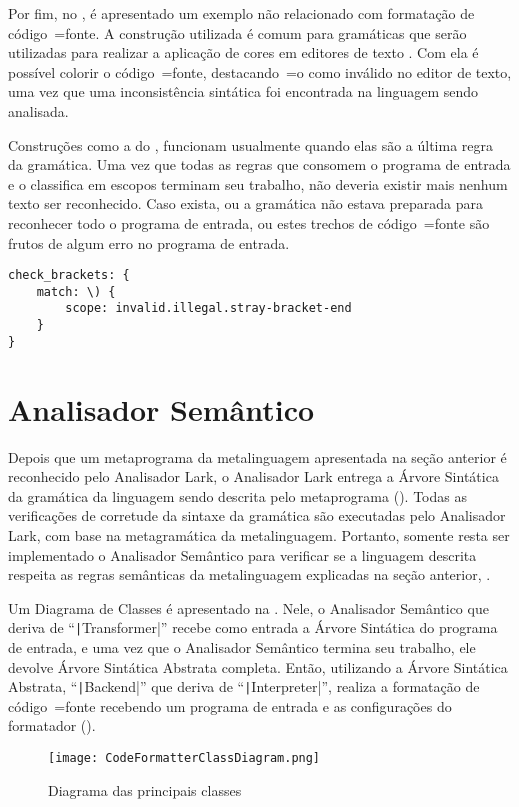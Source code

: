 Por fim,
no ,
é apresentado um exemplo não relacionado com formatação de código~=fonte.
A construção utilizada é comum para gramáticas que serão utilizadas para realizar a aplicação de cores em editores de texto \cite{vsCodeSyntaxHighlighthing}.
Com ela é possível colorir o código~=fonte,
destacando~=o como inválido no editor de texto,
uma vez que uma inconsistência sintática foi encontrada na linguagem sendo analisada.

Construções como a do ,
funcionam usualmente quando elas são a última regra da gramática.
Uma vez que todas as regras que consomem o programa de entrada e
o classifica em escopos terminam seu trabalho,
não deveria existir mais nenhum texto ser reconhecido.
Caso exista,
ou a gramática não estava preparada para reconhecer todo o programa de entrada,
ou estes trechos de código~=fonte são frutos de algum erro no programa de entrada.
\begin{lstlisting}[caption={Exemplo de Gramática, Reconhecimento de Erros},label={code:exemploDeGramaticaPawn5},style=yaml_style]
check_brackets: {
    match: \) {
        scope: invalid.illegal.stray-bracket-end
    }
}
\end{lstlisting}


\section{Analisador Semântico}
\label{section:AnalisadorSemantico}

Depois que um metaprograma da metalinguagem apresentada na seção anterior é reconhecido pelo Analisador Lark,
o Analisador Lark entrega a Árvore Sintática da gramática da linguagem sendo descrita pelo metaprograma ().
Todas as verificações de corretude da sintaxe da gramática são executadas pelo Analisador Lark,
com base na metagramática da metalinguagem.
Portanto,
somente resta ser implementado o Analisador Semântico para verificar se a linguagem descrita respeita as regras semânticas da metalinguagem explicadas na seção anterior,
.

Um Diagrama de Classes é apresentado na .
Nele,
o Analisador Semântico que deriva de ``\texttt|Transformer|'' recebe como entrada a Árvore Sintática do programa de entrada,
e uma vez que o Analisador Semântico termina seu trabalho,
ele devolve Árvore Sintática Abstrata completa.
Então,
utilizando a Árvore Sintática Abstrata,
``\texttt|Backend|'' que deriva de ``\texttt|Interpreter|'',
realiza a formatação de código~=fonte recebendo um programa de entrada e
as configurações do formatador ().
\begin{figure}[!htb]
\caption{Diagrama das principais classes}
\label{figure:CodeFormatterClassDiagram}
\centering
\texttt{[image: CodeFormatterClassDiagram.png]}
\end{figure}

